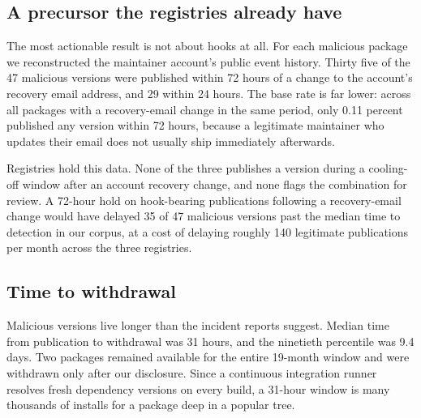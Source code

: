 \subsection{A precursor the registries already have}

The most actionable result is not about hooks at all. For each malicious
package we reconstructed the maintainer account's public event history. Thirty
five of the 47 malicious versions were published within 72 hours of a change to
the account's recovery email address, and 29 within 24 hours. The base rate is
far lower: across all packages with a recovery-email change in the same period,
only 0.11 percent published any version within 72 hours, because a legitimate
maintainer who updates their email does not usually ship immediately
afterwards.

Registries hold this data. None of the three publishes a version during a
cooling-off window after an account recovery change, and none flags the
combination for review. A 72-hour hold on hook-bearing publications following
a recovery-email change would have delayed 35 of 47 malicious versions past the
median time to detection in our corpus, at a cost of delaying roughly 140
legitimate publications per month across the three registries.

\subsection{Time to withdrawal}

Malicious versions live longer than the incident reports suggest. Median time
from publication to withdrawal was 31 hours, and the ninetieth percentile was
9.4 days. Two packages remained available for the entire 19-month window and
were withdrawn only after our disclosure. Since a continuous integration runner
resolves fresh dependency versions on every build, a 31-hour window is many
thousands of installs for a package deep in a popular tree.
